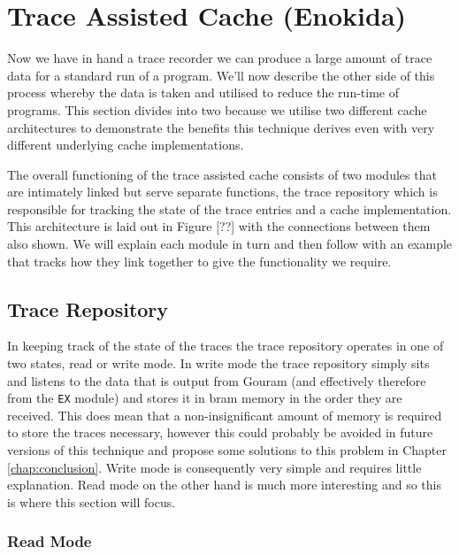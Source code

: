 
\section{Trace Assisted Cache (Enokida)}

Now we have in hand a trace recorder we can produce a large amount of trace data for a standard run of a program. We'll now describe the other side of this process whereby the data is taken and utilised to reduce the run-time of programs. This section divides into two because we utilise two different cache architectures to demonstrate the benefits this technique derives even with very different underlying cache implementations. 

The overall functioning of the trace assisted cache consists of two modules that are intimately linked but serve separate functions, the trace repository which is responsible for tracking the state of the trace entries and a cache implementation. This architecture is laid out in Figure [??] with the connections between them also shown. We will explain each module in turn and then follow with an example that tracks how they link together to give the functionality we require.

\subsection{Trace Repository}

In keeping track of the state of the traces the trace repository operates in one of two states, read or write mode. In write mode the trace repository simply sits and listens to the data that is output from Gouram (and effectively therefore from the \texttt{EX} module) and stores it in \gls{bram} memory in the order they are received. This does mean that a non-insignificant amount of memory is required to store the traces necessary, however this could probably be avoided in future versions of this technique and propose some solutions to this problem in Chapter \ref{chap:conclusion}. Write mode is consequently very simple and requires little explanation. Read mode on the other hand is much more interesting and so this is where this section will focus.

\subsubsection{Read Mode}
\label{subsec:read-mode}


